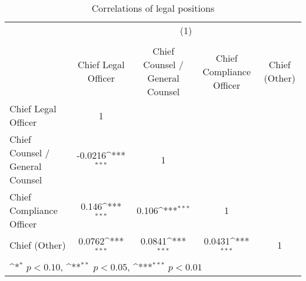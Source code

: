 \begin{table}[htbp]\centering
\def\sym#1{\ifmmode^{#1}\else\(^{#1}\)\fi}
\caption{Correlations of legal positions}
\begin{tabular}{l*{4}{c}}
\toprule
                &\multicolumn{4}{c}{(1)}                                                    \\
                &\multicolumn{4}{c}{}                                                       \\
                &Chief Legal Officer         &Chief Counsel / General Counsel         &Chief Compliance Officer         &Chief (Other)         \\
\midrule
Chief Legal Officer&        1         &                  &                  &                  \\
Chief Counsel / General Counsel&  -0.0216\sym{***}&        1         &                  &                  \\
Chief Compliance Officer&    0.146\sym{***}&    0.106\sym{***}&        1         &                  \\
Chief (Other)   &   0.0762\sym{***}&   0.0841\sym{***}&   0.0431\sym{***}&        1         \\
\bottomrule
\multicolumn{5}{l}{\footnotesize \sym{*} \(p<0.10\), \sym{**} \(p<0.05\), \sym{***} \(p<0.01\)}\\
\end{tabular}
\end{table}
